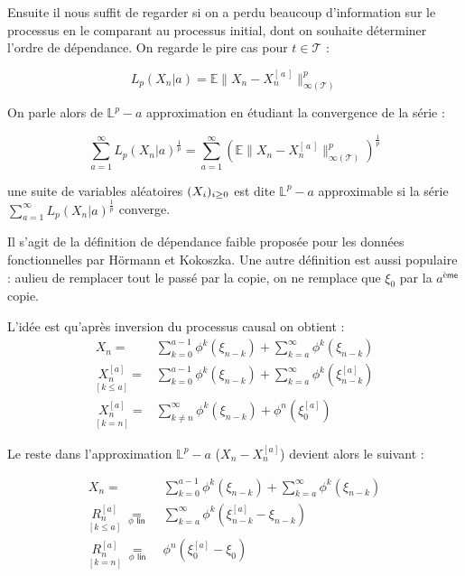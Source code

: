 \bigskip

Ensuite il nous suffit de regarder si on a perdu beaucoup d'information sur le processus en le comparant au processus initial, dont on souhaite déterminer l'ordre de dépendance. On regarde le pire cas pour $t \in \mathcal T$ :

$$L_p(X_n | a ) = {\mathds E  \lVert {X_n} - {X_n^{[\, a \, ]}} } \rVert_{\infty(\mathcal T)} ^p$$

On parle alors de $\mathds L^p-a$ approximation en étudiant la convergence de la série :

$$\sum\limits_{a=1}^\infty L_p(X_n | a )^{\frac 1 p} = \sum\limits_{a=1}^\infty \left({\mathds E  \lVert {X_n} - {X_n^{[\, a \, ]}} } \rVert_{\infty(\mathcal T)} ^p\right)^{\frac 1 p}$$

\begin{definition}
	une suite de variables aléatoires $( {X}_{i})_{i \geq 0}$ est dite $\mathds L^p - a$ approximable si la série $\sum\limits_{a=1}^\infty L_p(X_n | a )^{\frac 1 p}$ converge.
\end{definition}


Il s'agit de la définition de dépendance faible proposée pour les données fonctionnelles par Hörmann et Kokoszka\cite{weakly-dependent-functional-data}. Une autre définition est aussi populaire : aulieu de remplacer tout le passé par la copie, on ne remplace que $\xi_0$ par la $a^{\textsf{ème}}$ copie.

L'idée est qu'après inversion du processus causal on obtient :
\begin{align*}
	X_n =                               & \sum\limits_{k=0}^{a-1} \phi^k( \xi_{n-k}) + \sum\limits_{k=a}^{\infty} \phi^k( \xi_{n-k})
	\\
	\underset {[k\leq a]} {X_n^{[a]}} = & \sum\limits_{k=0}^{a-1} \phi^k( \xi_{n-k}) + \sum\limits_{k=a}^{\infty} \phi^k( \xi_{n-k}^{[a]})
	\\
	\underset {[k = n]} {X_n^{[a]}} =   & \sum\limits_{k \neq n}^{\infty} \phi^k( \xi_{n-k}) + \phi^n( \xi_{0}^{[a]})
\end{align*}

Le reste dans l'approximation $\mathds L^p-a$ ($X_n - X_n^{[a]}$) devient alors le suivant :

\begin{align*}
	X_n =                                                                     & \sum\limits_{k=0}^{a-1} \phi^k( \xi_{n-k}) + \sum\limits_{k=a}^{\infty} \phi^k( \xi_{n-k})
	\\
	\underset {[k\leq a]} {R_n^{[a]}} \; \underset {\phi \textsf{ lin}}{=} \; & \sum\limits_{k=a}^{\infty} \phi^k( \xi_{n-k}^{[a]} - \xi_{n-k})
	\\
	\underset {[k = n]} {R_n^{[a]}} \; \underset {\phi \textsf{ lin}}{=} \;   & \phi^n( \xi_{0}^{[a]} - \xi_0)
\end{align*}


